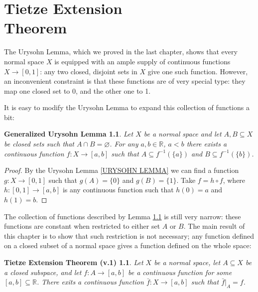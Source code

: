 \documentclass[11pt, letterpaper, oneside]{report}
\renewcommand{\chaptermark}[1]{\markboth{#1}{}}
\theoremstyle{pplain}
\newtheorem{GULEMMA}[theorem]{Generalized Urysohn Lemma}
\newtheorem{TIETZE1}[theorem]{Tietze Extension Theorem (v.1)}
\newtheorem{ITERMVALUE THM}[theorem]{Intermediate Value Theorem}
\newtheorem{HEINEBOREL THM}[theorem]{Heine-Borel Theorem}
\newtheorem{UMETR THM}[theorem]{Urysohn Metrization Theorem}
\newtheorem{UMETR2 THM}[theorem]{Urysohn Metrization Theorem (v.2)}
\theoremstyle{ddefinition}
\theoremstyle{nnn}
\newtheorem{TDA NN}[theorem]{Topological Data Analysis. }
\theoremstyle{eexercise}
\newcommand{\R}{{\mathbb R}}
\begin{document}
 
\newpage

\chapter[Tietze Extension Theorem]{Tietze Extension \\ Theorem}
\chaptermark{Tietze Extension Theorem}

\thispagestyle{firststyle}

 
 
 
 The Urysohn Lemma, which we proved in the last chapter, shows that every normal space  $X$
 is equipped with an ample supply of continuous functions $X\to [0, 1]$: any two closed, disjoint sets
 in $X$ give one such function. However, an inconvenient constraint  is that these
 functions are of very special type: they map one closed set to 0, and the other one to 1. 
 
 It is easy to modify the Urysohn Lemma to expand this collection of functions a bit:
  
  
\begin{GULEMMA}
\label{GEN URYSOHN LEMMA}
Let $X$ be a normal space and let $A, B\subseteq X$ be closed sets such that 
$A\cap B = \varnothing$. For any $a, b\in \R$, $a < b$ there exists a continuous function $f\colon X\to [a, b]$
such that $A\subseteq f^{-1}(\{a\})$ and $B \subseteq f^{-1}(\{b\})$. 
\end{GULEMMA}


\begin{proof}
By the Urysohn Lemma \ref{URYSOHN LEMMA}  we can find a function $g\colon X\to [0,1]$
such that $g(A) = \{0\}$ and $g(B) = \{1\}$. Take $f = h\circ f$, where 
$h\colon [0, 1] \to [a, b]$ is any continuous function such that $h(0) = a$ and $h(1) = b$. 
\end{proof}

The collection of functions described by Lemma \ref{GEN URYSOHN LEMMA} is still very narrow: 
these functions are constant  when restricted to either set $A$ or $B$. The main result of this chapter 
is to show that such restriction is not necessary;  any function defined on a closed subset of a normal space
gives a function defined on the whole space:


\begin{TIETZE1}
\label{TIETZE1 THM}
Let $X$ be a normal space, let $A\subseteq X$ be a closed subspace, and let 
$f\colon A\to [a, b]$ be a continuous function for some $[a, b]\subseteq \R$. 
There exits a continuous function $\bar{f}\colon X \to [a, b]$ such that $\bar{f}|_{A} = f$. 
\end{TIETZE1} 
\end{document}

